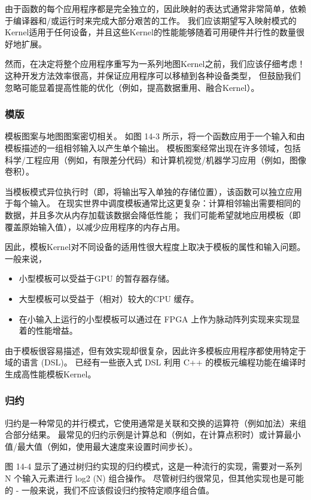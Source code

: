 由于函数的每个应用程序都是完全独立的，因此映射的表达式通常非常简单，依赖于编译器和/或运行时来完成大部分艰苦的工作。 
我们应该期望写入映射模式的Kernel适用于任何设备，并且这些Kernel的性能能够随着可用硬件并行性的数量很好地扩展。

然而，在决定将整个应用程序重写为一系列地图Kernel之前，我们应该仔细考虑！ 
这种开发方法效率很高，并保证应用程序可以移植到各种设备类型，
但鼓励我们忽略可能显着提高性能的优化（例如，提高数据重用、融合Kernel）。

\subsubsection{模版}
模板图案与地图图案密切相关。 如图 14-3 所示，将一个函数应用于一个输入和由模板描述的一组相邻输入以产生单个输出。 
模板图案经常出现在许多领域，包括科学/工程应用（例如，有限差分代码）和计算机视觉/机器学习应用（例如，图像卷积）。

当模板模式异位执行时（即，将输出写入单独的存储位置），该函数可以独立应用于每个输入。 
在现实世界中调度模板通常比这更复杂：计算相邻输出需要相同的数据，并且多次从内存加载该数据会降低性能； 
我们可能希望就地应用模板（即覆盖原始输入值），以减少应用程序的内存占用。

因此，模板Kernel对不同设备的适用性很大程度上取决于模板的属性和输入问题。 一般来说，

\begin{itemize}
	\item 小型模板可以受益于GPU 的暂存器存储。

	\item 大型模板可以受益于（相对）较大的CPU 缓存。

	\item 在小输入上运行的小型模板可以通过在 FPGA 上作为脉动阵列实现来实现显着的性能增益。
\end{itemize}

由于模板很容易描述，但有效实现却很复杂，因此许多模板应用程序都使用特定于域的语言 (DSL)。 
已经有一些嵌入式 DSL 利用 C++ 的模板元编程功能在编译时生成高性能模板Kernel。

\subsubsection{归约}
归约是一种常见的并行模式，它使用通常是关联和交换的运算符（例如加法）来组合部分结果。 
最常见的归约示例是计算总和（例如，在计算点积时）或计算最小值/最大值（例如，使用最大速度来设置时间步长）。

图 14-4 显示了通过树归约实现的归约模式，这是一种流行的实现，需要对一系列 N 个输入元素进行 log2 (N) 组合操作。 
尽管树归约很常见，但其他实现也是可能的 - 一般来说，我们不应该假设归约按特定顺序组合值。

